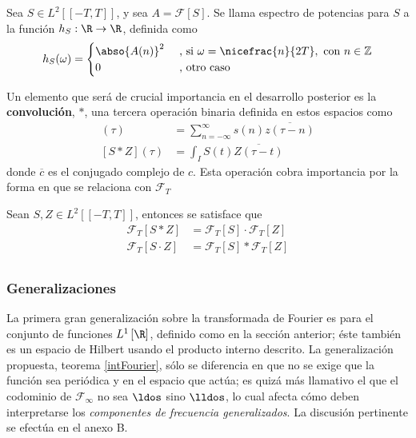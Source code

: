 \begin{definicion}
Sea $S \in L^{2}\left[[-T,T]\right]$, y sea $A = \mathcal{F}[S]$. Se llama espectro de potencias 
para $S$ a la función $h_S : \R \rightarrow \R $, definida como
\begin{equation*}
h_S(\omega) = 
\begin{cases}
\abso{A(n)}^{2} & \text{ , si } \omega = \nicefrac{n}{2T}, \text{   con } n\in \mathbb{Z} \\
0 & \text{ ,  otro caso}
\end{cases}
\end{equation*}
\label{espec}
\end{definicion}

Un elemento que será de crucial importancia en el desarrollo posterior es la \textbf{convolución}, 
$\ast$, una tercera operación binaria definida en estos espacios como
%
\begin{align*}
[s \ast z] (\tau) &= \sum_{n=-\infty}^{\infty} s(n) \overline{z(\tau-n)} \\
[S \ast Z] (\tau) &= \int_I S(t) \overline{Z(\tau-t)}
\end{align*}
%
donde $\overline{c}$ es el conjugado complejo de $c$. 
Esta operación cobra importancia por la forma en que se relaciona con $\mathcal{F}_T$
%
\begin{teorema}%
Sean $S,Z \in L^{2}\left[[-T,T]\right]$, entonces se satisface que
\begin{align*}
\mathcal{F}_T[S\ast Z]  &= \mathcal{F}_T[S] \cdot \mathcal{F}_T[Z] \\
\mathcal{F}_T[S\cdot Z] &= \mathcal{F}_T[S] \ast  \mathcal{F}_T[Z] \\
\end{align*}
\label{t_convolucion}
\end{teorema}

\subsubsection{Generalizaciones}

La primera gran generalización sobre la transformada de Fourier es para el conjunto de funciones 
$L^{1}\left[ \R \right]$, definido como en la sección anterior; éste también es un espacio de 
Hilbert usando el producto interno descrito.
La generalización propuesta, teorema \ref{intFourier}, sólo se diferencia en que no se exige que 
la función sea periódica y en el espacio que actúa; 
es quizá más llamativo el que el codominio de $\mathcal{F}_\infty$ no sea $\ldos$ sino $\lldos$,
lo cual afecta cómo deben interpretarse los \textit{componentes de frecuencia generalizados}. La 
discusión pertinente se efectúa en el anexo B.

